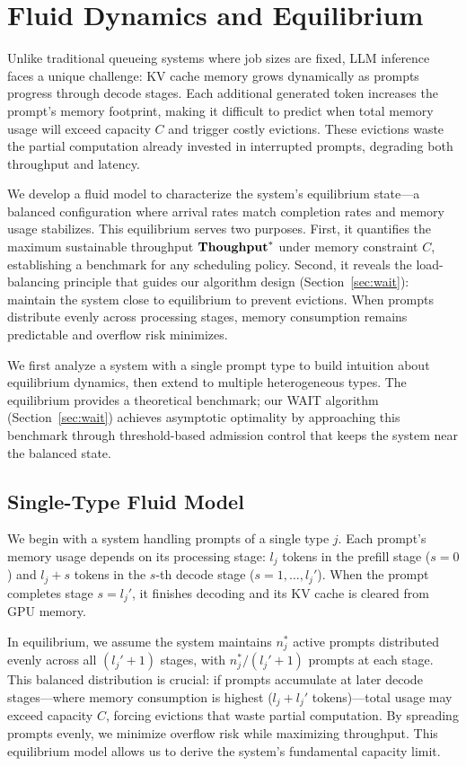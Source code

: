 \section{Fluid Dynamics and Equilibrium}\label{sec:fluid}
Unlike traditional queueing systems where job sizes are fixed, LLM inference faces a unique challenge: KV cache memory grows dynamically as prompts progress through decode stages. Each additional generated token increases the prompt's memory footprint, making it difficult to predict when total memory usage will exceed capacity $C$ and trigger costly evictions. These evictions waste the partial computation already invested in interrupted prompts, degrading both throughput and latency.

We develop a fluid model to characterize the system's equilibrium state---a balanced configuration where arrival rates match completion rates and memory usage stabilizes. This equilibrium serves two purposes. First, it quantifies the maximum sustainable throughput $\textbf{Thoughput}^*$ under memory constraint $C$, establishing a benchmark for any scheduling policy. Second, it reveals the load-balancing principle that guides our algorithm design (Section~\ref{sec:wait}): maintain the system close to equilibrium to prevent evictions. When prompts distribute evenly across processing stages, memory consumption remains predictable and overflow risk minimizes.

We first analyze a system with a single prompt type to build intuition about equilibrium dynamics, then extend to multiple heterogeneous types. The equilibrium provides a theoretical benchmark; our WAIT algorithm (Section~\ref{sec:wait}) achieves asymptotic optimality by approaching this benchmark through threshold-based admission control that keeps the system near the balanced state.

\subsection{Single-Type Fluid Model}
We begin with a system handling prompts of a single type \(j\). Each prompt's memory usage depends on its processing stage: \(l_j\) tokens in the prefill stage ($s=0$) and \(l_j + s\) tokens in the \(s\)-th decode stage (\(s = 1, \dots, l_j'\)). When the prompt completes stage $s = l_j'$, it finishes decoding and its KV cache is cleared from GPU memory.

In equilibrium, we assume the system maintains \(n_j^*\) active prompts distributed evenly across all $(l_j'+1)$ stages, with \(n_j^*/(l_j'+1)\) prompts at each stage. This balanced distribution is crucial: if prompts accumulate at later decode stages---where memory consumption is highest ($l_j + l_j'$ tokens)---total usage may exceed capacity $C$, forcing evictions that waste partial computation. By spreading prompts evenly, we minimize overflow risk while maximizing throughput. This equilibrium model allows us to derive the system's fundamental capacity limit.

